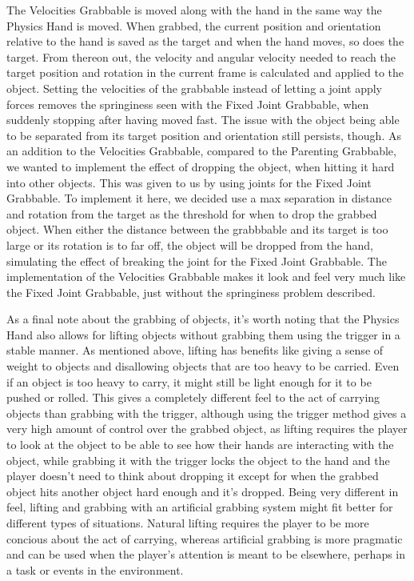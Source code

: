 The Velocities Grabbable is moved along with the hand in the same way the Physics Hand is moved. When grabbed, the current position and orientation relative to the hand is saved as the target and when the hand moves, so does the target. From thereon out, the velocity and angular velocity needed to reach the target position and rotation in the current frame is calculated and applied to the object. Setting the velocities of the grabbable instead of letting a joint apply forces removes the springiness seen with the Fixed Joint Grabbable, when suddenly stopping after having moved fast. The issue with the object being able to be separated from its target position and orientation still persists, though. As an addition to the Velocities Grabbable, compared to the Parenting Grabbable, we wanted to implement the effect of dropping the object, when hitting it hard into other objects. This was given to us by using joints for the Fixed Joint Grabbable. To implement it here, we decided use a max separation in distance and rotation from the target as the threshold for when to drop the grabbed object. When either the distance between the grabbbable and its target is too large or its rotation is to far off, the object will be dropped from the hand, simulating the effect of breaking the joint for the Fixed Joint Grabbable. The implementation of the Velocities Grabbable makes it look and feel very much like the Fixed Joint Grabbable, just without the springiness problem described.

As a final note about the grabbing of objects, it's worth noting that the Physics Hand also allows for lifting objects without grabbing them using the trigger in a stable manner. As mentioned above, lifting has benefits like giving a sense of weight to objects and disallowing objects that are too heavy to be carried. Even if an object is too heavy to carry, it might still be light enough for it to be pushed or rolled. This gives a completely different feel to the act of carrying objects than grabbing with the trigger, although using the trigger method gives a very high amount of control over the grabbed object, as lifting requires the player to look at the object to be able to see how their hands are interacting with the object, while grabbing it with the trigger locks the object to the hand and the player doesn't need to think about dropping it except for when the grabbed object hits another object hard enough and it's dropped. Being very different in feel, lifting and grabbing with an artificial grabbing system might fit better for different types of situations. Natural lifting requires the player to be more concious about the act of carrying, whereas artificial grabbing is more pragmatic and can be used when the player's attention is meant to be elsewhere, perhaps in a task or events in the environment.

